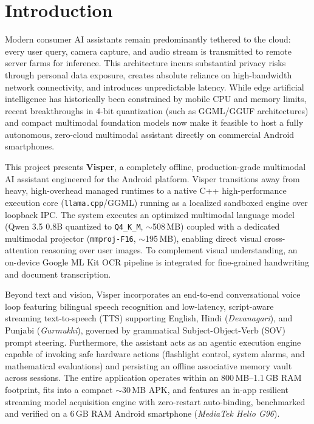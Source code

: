 \documentclass[11pt]{article}
\begin{document}
\section{Introduction}
Modern consumer AI assistants remain predominantly tethered to the cloud: every user query,
camera capture, and audio stream is transmitted to remote server farms for inference. This
architecture incurs substantial privacy risks through personal data exposure, creates absolute
reliance on high-bandwidth network connectivity, and introduces unpredictable latency.
While edge artificial intelligence has historically been constrained by mobile CPU and memory
limits, recent breakthroughs in 4-bit quantization (such as GGML/GGUF architectures) and
compact multimodal foundation models now make it feasible to host a fully autonomous,
zero-cloud multimodal assistant directly on commercial Android smartphones.

This project presents \textbf{Visper}, a completely offline, production-grade multimodal AI
assistant engineered for the Android platform. Visper transitions away from heavy, high-overhead
managed runtimes to a native C++ high-performance execution core (\texttt{llama.cpp}/GGML)
running as a localized sandboxed engine over loopback IPC. The system executes an optimized
multimodal language model (Qwen 3.5 0.8B quantized to \texttt{Q4\_K\_M}, $\sim$508\,MB)
coupled with a dedicated multimodal projector (\texttt{mmproj-F16}, $\sim$195\,MB), enabling
direct visual cross-attention reasoning over user images. To complement visual understanding,
an on-device Google ML Kit OCR pipeline is integrated for fine-grained handwriting and document
transcription. 

Beyond text and vision, Visper incorporates an end-to-end conversational voice loop featuring
bilingual speech recognition and low-latency, script-aware streaming text-to-speech (TTS) supporting
English, Hindi (\textit{Devanagari}), and Punjabi (\textit{Gurmukhi}), governed by grammatical
Subject-Object-Verb (SOV) prompt steering. Furthermore, the assistant acts as an agentic execution
engine capable of invoking safe hardware actions (flashlight control, system alarms, and
mathematical evaluations) and persisting an offline associative memory vault across sessions.
The entire application operates within an 800\,MB--1.1\,GB RAM footprint, fits into a compact
$\sim$30\,MB APK, and features an in-app resilient streaming model acquisition engine with
zero-restart auto-binding, benchmarked and verified on a 6\,GB RAM Android smartphone
(\textit{MediaTek Helio G96}).
\end{document}

